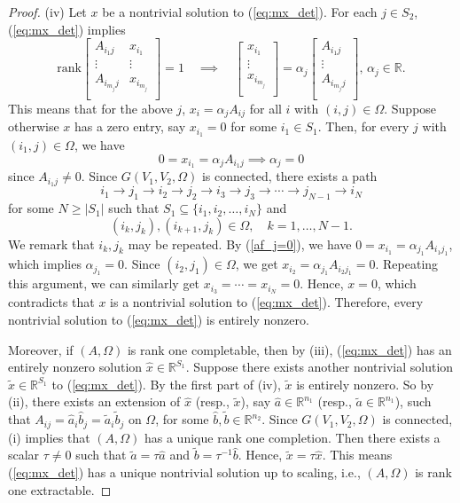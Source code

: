 \documentclass{amsart}
\newcommand{\re}{\mathbb{R}}
\newcommand{\ta}{\tilde{a}}
\newcommand{\tb}{\tilde{b}}
\newcommand{\tx}{\tilde{x}}
\def\af{\alpha}
\def\rank{\mbox{rank}}
\newcommand{\reff}[1]{(\ref{#1})}
\newcommand{\ddd}{,\ldots,}
\newcommand{\be}{\begin{equation}}
\newcommand{\ee}{\end{equation}}
\newcommand{\bbm}{\begin{bmatrix}}
\newcommand{\ebm}{\end{bmatrix}}
\theoremstyle{definition}
\numberwithin{equation}{section}
\begin{document}
\begin{proof}
\noindent (iv) Let $x$ be a nontrivial solution to \reff{eq:mx_det}.
For each $j \in S_2$, \reff{eq:mx_det} implies
\[
\rank 
\bbm
A_{i_1 j} & x_{i_1} \\
\vdots & \vdots \\
A_{i_{m_j} j} & x_{i_{m_j}} \\
\ebm = 1
\quad \implies \quad
\bbm
x_{i_1} \\
\vdots \\
x_{i_{m_j}} \\
\ebm =
\af_j \bbm
A_{i_1 j} \\
\vdots \\
A_{i_{m_j} j} \\
\ebm, \,
\af_j \in \re.
\]
This means that for the above $j$, $x_i = \af_j A_{ij}$ for all $i$ with $(i,j) \in \Omega$.
Suppose otherwise $x$ has a zero entry, say
$x_{i_1} = 0$ for some $i_1 \in S_1$.
Then, for every $j$ with $(i_1, j) \in \Omega$, we have
\be\label{af_j=0}
0 = x_{i_1} = \af_j A_{i_1 j} \implies \af_j = 0
\ee
since $A_{i_1 j} \ne 0$.
Since $G(V_1, V_2, \Omega)$ is connected, there exists a path
\[
i_1 \to j_1 \to i_2 \to j_2 \to i_3 \to j_3 \to \cdots \to j_{N-1} \to i_{N}
\]
for some $N \ge |S_1|$ such that $S_1 \subseteq \{ i_1 , i_2 \ddd i_N \}$ and 
\[
(i_k, j_k), (i_{k+1}, j_k) \in \Omega, \quad k = 1 \ddd N-1.
\]
We remark that $i_k, j_k$ may be repeated.
By \reff{af_j=0}, we have
$0 = x_{i_1} = \af_{j_1} A_{i_1 j_1}$,
which implies $\af_{j_1} = 0$.
Since $(i_2, j_1) \in \Omega$, we get $x_{i_2} = \af_{j_1} A_{i_2 j_1} = 0$.
Repeating this argument, we can similarly get
$x_{i_3} = \cdots = x_{i_N} = 0$.
Hence, $x = 0$, which contradicts that $x$ is a nontrivial solution to \reff{eq:mx_det}.
Therefore, every nontrivial solution to \reff{eq:mx_det} is entirely nonzero.



Moreover, if $(A, \Omega)$ is rank one completable, then by (iii),
\reff{eq:mx_det} has an entirely nonzero solution $\hat{x} \in \re^{S_1}$.
Suppose there exists another nontrivial solution $\tx \in \re^{S_1}$ to \reff{eq:mx_det}.
By the first part of (iv), $\tx$ is entirely nonzero.
So by (ii), there exists an extension of $\hat{x}$ (resp., $\tx$), 
say $\hat{a} \in \re^{n_1}$ (resp., $\ta \in \re^{n_1}$), 
such that $A_{ij} = \hat{a}_i\hat{b}_j = \ta_i\tb_j$ on $\Omega$, 
for some $\hat{b}, \tb \in \re^{n_2}$.
Since $G(V_1, V_2, \Omega)$ is connected, (i) implies that $(A, \Omega)$ has a unique rank one completion.
Then there exists a scalar $\tau \ne 0$ such that 
$\ta = \tau \hat{a}$ and $\tb = \tau^{-1} \hat{b}$.
Hence, $\tx = \tau \hat{x}$.
This means \reff{eq:mx_det} has a unique nontrivial solution up to scaling,
i.e., $(A, \Omega)$ is rank one extractable.
\end{proof}
\end{document}
